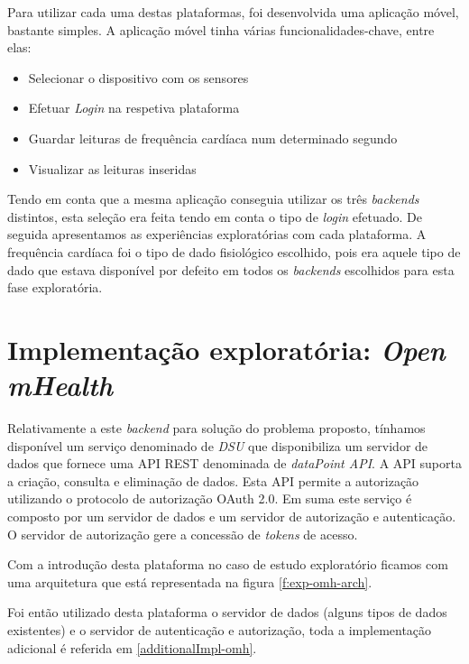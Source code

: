 Para utilizar cada uma destas plataformas, foi desenvolvida uma aplicação móvel, bastante simples. A aplicação móvel tinha várias funcionalidades-chave, entre elas:
\begin{itemize}
  \item Selecionar o dispositivo com os sensores
  \item Efetuar \textit{Login} na respetiva plataforma
  \item Guardar leituras de frequência cardíaca num determinado segundo
  \item Visualizar as leituras inseridas
\end{itemize}

Tendo em conta que a mesma aplicação conseguia utilizar os três \textit{backends} distintos, esta seleção era feita tendo em conta o tipo de \textit{login} efetuado. De seguida apresentamos as experiências exploratórias com cada plataforma.
A frequência cardíaca foi o tipo de dado fisiológico escolhido, pois era aquele tipo de dado que estava disponível por defeito em todos os \textit{backends} escolhidos para esta fase exploratória. 
\newpage

\section{Implementação exploratória: \textit{Open mHealth}}
\label{cap4:exp-omh}
Relativamente a este \textit{backend} para solução do problema proposto, tínhamos disponível um serviço denominado de \textit{\gls{DSU}} que disponibiliza um servidor de dados que fornece uma \gls{API} \gls{REST} denominada de \textit{dataPoint API}. A \gls{API} suporta a criação, consulta e eliminação de dados. Esta \gls{API} permite a autorização utilizando o protocolo de autorização OAuth 2.0. Em suma este serviço é composto por um servidor de dados e um servidor de autorização e autenticação. O servidor de autorização gere a concessão de \textit{tokens} de acesso. \cite{omhstorage} \par
Com a introdução desta plataforma no caso de estudo exploratório ficamos com uma arquitetura que está representada na figura \ref{f:exp-omh-arch}. \par
Foi então utilizado desta plataforma o servidor de dados (alguns tipos de dados existentes) e o servidor de autenticação e autorização, toda a implementação adicional é referida em \ref{additionalImpl-omh}.

